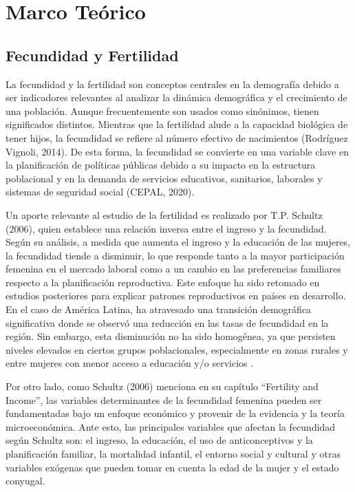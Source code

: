 \documentclass[Royal,times,sageh]{sagej}
\begin{document}
\section{Marco Teórico}\label{marco-teuxf3rico}

\subsection{Fecundidad y Fertilidad}\label{fecundidad-y-fertilidad}

La fecundidad y la fertilidad son conceptos centrales en la demografía
debido a ser indicadores relevantes al analizar la dinámica demográfica
y el crecimiento de una población. Aunque frecuentemente son usados como
sinónimos, tienen significados distintos. Mientras que la fertilidad
alude a la capacidad biológica de tener hijos, la fecundidad se refiere
al número efectivo de nacimientos (Rodríguez Vignoli, 2014). De esta
forma, la fecundidad se convierte en una variable clave en la
planificación de políticas públicas debido a su impacto en la estructura
poblacional y en la demanda de servicios educativos, sanitarios,
laborales y sistemas de seguridad social (CEPAL, 2020).

Un aporte relevante al estudio de la fertilidad es realizado por T.P.
Schultz (2006), quien establece una relación inversa entre el ingreso y
la fecundidad. Según su análisis, a medida que aumenta el ingreso y la
educación de las mujeres, la fecundidad tiende a disminuir, lo que
responde tanto a la mayor participación femenina en el mercado laboral
como a un cambio en las preferencias familiares respecto a la
planificación reproductiva. Este enfoque ha sido retomado en estudios
posteriores para explicar patrones reproductivos en países en
desarrollo. En el caso de América Latina, ha atravesado una transición
demográfica significativa donde se observó una reducción en las tasas de
fecundidad en la región. Sin embargo, esta disminución no ha sido
homogénea, ya que persisten niveles elevados en ciertos grupos
poblacionales, especialmente en zonas rurales y entre mujeres con menor
acceso a educación y/o servicios \citep{schultz2006fertility}.

Por otro lado, como Schultz (2006) menciona en su capítulo ``Fertility
and Income'', las variables determinantes de la fecundidad femenina
pueden ser fundamentadas bajo un enfoque económico y provenir de la
evidencia y la teoría microeconómica. Ante esto, las principales
variables que afectan la fecundidad según Schultz son: el ingreso, la
educación, el uso de anticonceptivos y la planificación familiar, la
mortalidad infantil, el entorno social y cultural y otras variables
exógenas que pueden tomar en cuenta la edad de la mujer y el estado
conyugal.
\end{document}
